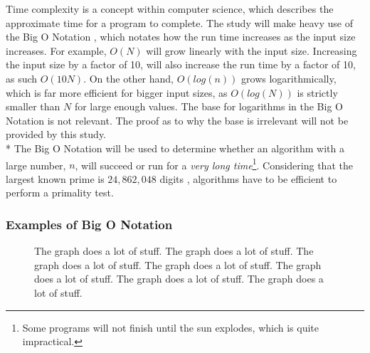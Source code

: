 \documentclass[main.tex]{subfiles}
\begin{document}
Time complexity \cite{theorem:time_comp} is a concept within computer science, which describes the approximate time for a program to complete. The study will make heavy use of the Big O Notation \cite{theorem:big_O}, which notates how the run time increases as the input size increases. For example, $O(N)$ will grow linearly with the input size. Increasing the input size by a factor of 10, will also increase the run time by a factor of 10, as such $O(10N)$. On the other hand, $O(log(n))$ grows logarithmically, which is far more efficient for bigger input sizes, as $O(log(N))$ is strictly smaller than $N$ for large enough values. The base for logarithms in the Big O Notation is not relevant. The proof as to why the base is irrelevant will not be provided by this study.
\newline
\\*
The Big O Notation will be used to determine whether an algorithm with a large number, $n$, will succeed or run for a \textit{very long time}\footnote{Some programs will not finish until the sun explodes, which is quite impractical.}. Considering that the largest known prime is $24,862,048$ digits \cite{prime:largest_digits}, algorithms have to be efficient to perform a primality test. 

\subsubsection{Examples of Big O Notation}


\begin{figure}[ht]
    \begin{center}
    \end{center}
\caption{The graph does a lot of stuff. The graph does a lot of stuff. The graph does a lot of stuff. The graph does a lot of stuff. The graph does a lot of stuff. The graph does a lot of stuff. The graph does a lot of stuff.}
\end{figure}
\end{document}
